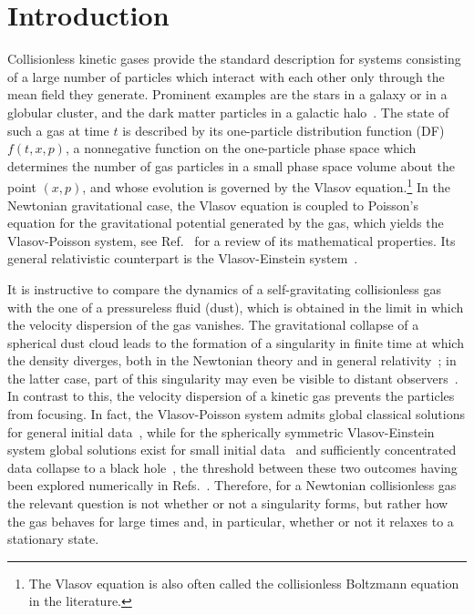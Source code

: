 \section{Introduction}
\label{Sec:Introduction}

Collisionless kinetic gases provide the standard description for systems consisting of a large number of particles which interact with each other only through the mean field they generate. Prominent examples are the stars in a galaxy or in a globular cluster, and the dark matter particles in a galactic halo~\cite{BinneyTremaine-Book}. The state of such a gas at time $t$ is described by its one-particle distribution function (DF) $f(t,x,p)$, a nonnegative function on the one-particle phase space which determines the number of gas particles in a small phase space volume about the point $(x,p)$, and whose evolution is governed by the Vlasov equation.\footnote{The Vlasov equation is also often called the collisionless Boltzmann equation in the literature.} In the Newtonian gravitational case, the Vlasov equation is coupled to Poisson's equation for the gravitational potential generated by the gas, which yields the Vlasov-Poisson system, see Ref.~\cite{gR07} for a review of its mathematical properties. Its general relativistic counterpart is the Vlasov-Einstein system~\cite{hA11}.

It is instructive to compare the dynamics of a self-gravitating collisionless gas with the one of a pressureless fluid (dust), which is obtained in the limit in which the velocity dispersion of the gas vanishes. The gravitational collapse of a spherical dust cloud leads to the formation of a singularity in finite time at which the density diverges, both in the Newtonian theory and in general relativity~\cite{jOhS39}; in the latter case, part of this singularity may even be visible to distant observers~\cite{dC84,nOoS11}. In contrast to this, the velocity dispersion of a kinetic gas prevents the particles from focusing. In fact, the Vlasov-Poisson system admits global classical solutions for general initial data~\cite{kP92,pLbP91,jS91}, while for the spherically symmetric Vlasov-Einstein system global solutions exist for small initial data~\cite{gRaR92} and sufficiently concentrated data collapse to a black hole~\cite{hAmKgR11}, the threshold between these two outcomes having been explored numerically in Refs.~\cite{gRaRjS98,Olabarrieta:2001wy,hAgR06,aAmC14}. Therefore, for a Newtonian collisionless gas the relevant question is not whether or not a singularity forms, but rather how the gas behaves for large times and, in particular, whether or not it relaxes to a stationary state.

